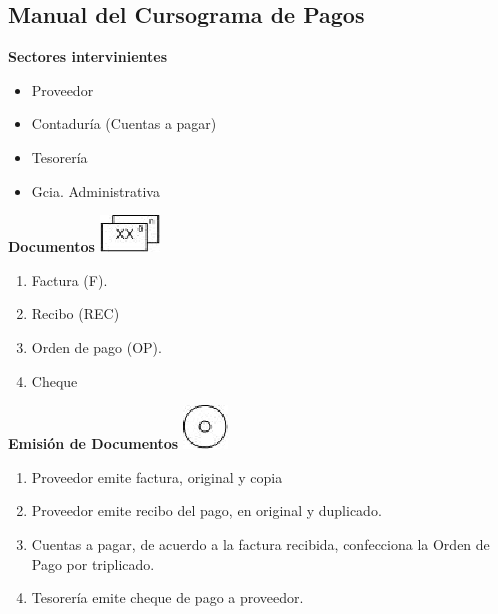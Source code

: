 \subsection{Manual del Cursograma de Pagos}

\begin{center}\textbf{Sectores intervinientes}\end{center}
\begin{itemize}
  \item Proveedor
  \item Contaduría (Cuentas a pagar)
  \item Tesorería
  \item Gcia. Administrativa
\end{itemize}

\begin{center}
  \textbf{Documentos}
  \includegraphics{./Images/Simbolos/simbolo-Documentos.png}
\end{center}
\begin{enumerate}
  \item Factura (F).
  \item Recibo (REC)
  \item Orden de pago (OP).
  \item Cheque
\end{enumerate}

\begin{center}
  \textbf{Emisión de Documentos}
  \includegraphics{./Images/Simbolos/simbolo-Emision-de-Documentos.png}
\end{center}
\begin{enumerate}
  \item Proveedor emite factura, original y copia
  \item Proveedor emite recibo del pago, en original y duplicado.
  \item Cuentas a pagar, de acuerdo a la factura recibida, confecciona la Orden de Pago por triplicado.
  \item Tesorería emite cheque de pago a proveedor.
\end{enumerate}

